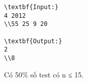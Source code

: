 \begin{verbatim}
\textbf{Input:}
4 2012
\\55 25 9 20

\textbf{Output:}
2
\\8\end{verbatim}
Có 50\% số test có n ≤ 15.